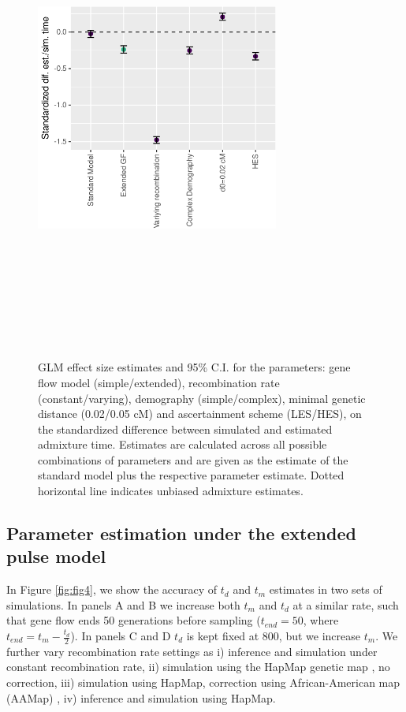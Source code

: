 \documentclass[]{article}
\begin{document}
\begin{figure}
\centering
\includegraphics[width=8cm,height=16cm,keepaspectratio]{Admixture_Time_Inference_Paper_Draft_files/figure-latex/fig3-1.pdf}
\caption{\label{fig:fig3} GLM effect size estimates and 95\% C.I. for the parameters: gene flow model (simple/extended), recombination rate (constant/varying), demography (simple/complex), minimal genetic distance (0.02/0.05 cM) and ascertainment scheme (LES/HES), on the standardized difference between simulated and estimated admixture time. Estimates are calculated across all possible combinations of parameters and are given as the estimate of the standard model plus the respective parameter estimate. Dotted horizontal line indicates unbiased admixture estimates.}
\end{figure}


\subsection{Parameter estimation under the extended pulse model}\label{estimating the Lomax-parameters under different conditions}
In Figure \ref{fig:fig4}, we show the accuracy of $t_d$ and $t_m$ estimates in two sets of simulations. In panels A and B we increase both $t_m$ and $t_d$ at a similar rate, such that gene flow ends 50 generations before sampling ($t_{end}=50$, where $t_{end}= t_m - \frac{t_d}{2}$). In panels C and D $t_d$ is kept fixed at 800, but we increase $t_m$. We further vary recombination rate settings as i) inference and simulation under constant recombination rate, ii) simulation using the HapMap genetic map \citep{HapMapConsortium_second_2007}, no correction, iii) simulation using HapMap, correction using African-American map (AAMap) \citep{hinch_landscape_2011}, iv) inference and simulation using HapMap. 
\end{document}
